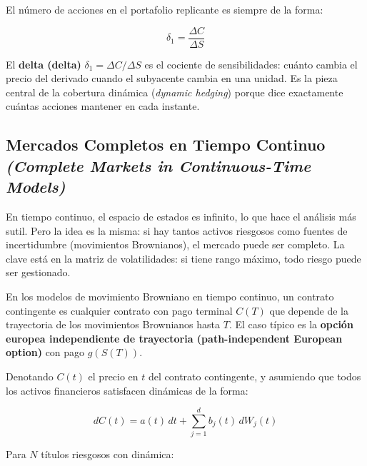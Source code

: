 \documentclass[12pt]{article}
\begin{document}
El n\'umero de acciones en el portafolio replicante es siempre de la forma:

\begin{equation}
  \delta_1 = \frac{\Delta C}{\Delta S}
  \tag{3.48}
\end{equation}

\begin{intuicionmat}
El \textbf{delta (delta)} $\delta_1 = \Delta C / \Delta S$ es el cociente de sensibilidades: cu\'anto cambia el precio del derivado cuando el subyacente cambia en una unidad. Es la pieza central de la cobertura din\'amica (\textit{dynamic hedging}) porque dice exactamente cu\'antas acciones mantener en cada instante.
\end{intuicionmat}

\subsection{Mercados Completos en Tiempo Continuo\\
\textit{(Complete Markets in Continuous-Time Models)}}

\begin{intuicion}
En tiempo continuo, el espacio de estados es infinito, lo que hace el an\'alisis m\'as sutil. Pero la idea es la misma: si hay tantos activos riesgosos como fuentes de incertidumbre (movimientos Brownianos), el mercado puede ser completo. La clave est\'a en la matriz de volatilidades: si tiene rango m\'aximo, todo riesgo puede ser gestionado.
\end{intuicion}

En los modelos de movimiento Browniano en tiempo continuo, un contrato contingente es cualquier contrato con pago terminal $C(T)$ que depende de la trayectoria de los movimientos Brownianos hasta $T$. El caso t\'ipico es la \textbf{opci\'on europea independiente de trayectoria (path-independent European option)} con pago $g(S(T))$.

Denotando $C(t)$ el precio en $t$ del contrato contingente, y asumiendo que todos los activos financieros satisfacen din\'amicas de la forma:

\begin{equation}
  dC(t) = a(t)\,dt + \sum_{j=1}^d b_j(t)\,dW_j(t)
  \tag{3.50}
\end{equation}

Para $N$ t\'itulos riesgosos con din\'amica:
\end{document}
